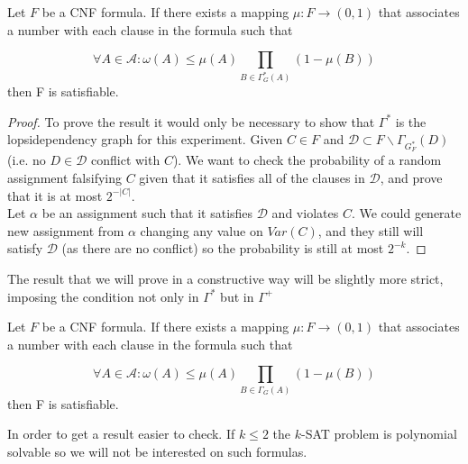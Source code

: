\begin{corollary}\label{LLLS}
	Let $F$ be a CNF formula. If there exists a mapping $\mu:F\to (0,1)$ that associates a number with each clause in the formula such that 
	
	$$
\forall A \in \mathcal{A} : \omega (A) \le \mu(A) \prod_{B\in\Gamma^*_G(A)} (1-\mu(B))
$$
	then F is satisfiable.
\end{corollary}
\begin{proof}
	To prove the result it would only be necessary to show  that $ \Gamma^*$ is the lopsidependency graph for this experiment. Given $C \in F$ and $\mathcal{D}\subset F\backslash \Gamma_{G_F^*}(D)\ $(i.e. no $D \in  \mathcal{D}$ conflict with $C$). We want to check the probability of a random assignment falsifying $C$ given that it satisfies all of the clauses in $\mathcal{D}$, and prove that it is at most $2^{-|C|}$. \\ 
	
Let $\alpha$ be an assignment such that it satisfies $\mathcal{D}$ and violates $C$. We could generate new assignment from $\alpha$ changing any value on $Var(C)$, and they still will satisfy $\mathcal{D}$ (as there are no conflict) so the probability is still at most $2^{-k}$. 


\end{proof}


The result that we will prove in a constructive way will be slightly more strict, imposing the condition not only in $\Gamma^*$ but in $\Gamma^+$ 


\begin{corollary}\label{LLLSC}
	Let $F$ be a CNF formula. If there exists a mapping $\mu:F\to (0,1)$ that associates a number with each clause in the formula such that 
	
	$$
\forall A \in \mathcal{A} : \omega (A) \le \mu(A) \prod_{B\in\Gamma_G(A)} (1-\mu(B))
$$
	then F is satisfiable.
\end{corollary}


In order to get a result easier to check. If $k\le 2$ the $k$-SAT problem is  polynomial solvable so we will not be interested on such formulas.

